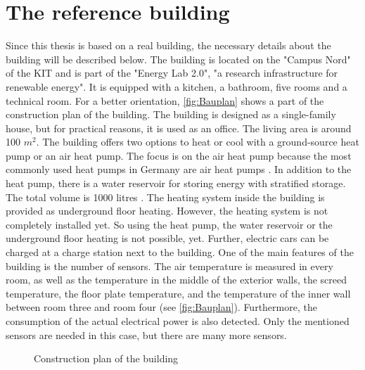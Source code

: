\section{The reference building}
\label{section:building}
    Since this thesis is based on a real building, the necessary details about the building will be described below.
    The building is located on the "Campus Nord" of the KIT and is part of the "Energy Lab 2.0", "a research infrastructure for renewable energy"\cite{KIT.2021}. It is equipped with a kitchen, a bathroom, five rooms and a technical room. For a better orientation, \autoref{fig:Bauplan} shows a part of the construction plan of the building. The building is designed as a single-family house, but for practical reasons, it is used as an office. The living area is around 100 $m^2$. The building offers two options to heat or cool with a ground-source heat pump or an air heat pump. The focus is on the air heat pump because the most commonly used heat pumps in Germany are air heat pumps \cite{bwp.2021}. In addition to the heat pump, there is a water reservoir for storing energy with stratified storage. The total volume is 1000 litres \cite{Oskar}. The heating system inside the building is provided as underground floor heating. However, the heating system is not completely installed yet. So using the heat pump, the water reservoir or the underground floor heating is not possible, yet. Further, electric cars can be charged at a charge station next to the building.
    \newline
    One of the main features of the building is the number of sensors. The air temperature is measured in every room, as well as the temperature in the middle of the exterior walls, the screed temperature, the floor plate temperature, and the temperature of the inner wall between room three and room four (see \autoref{fig:Bauplan}). Furthermore, the consumption of the actual electrical power is also detected. Only the mentioned sensors are needed in this case, but there are many more sensors.
    
    \begin{figure}
        \centering
        \def\svgwidth{360pt}
        
        \caption{Construction plan of the building \cite{Bauplan}}
        \label{fig:Bauplan}
    \end{figure}